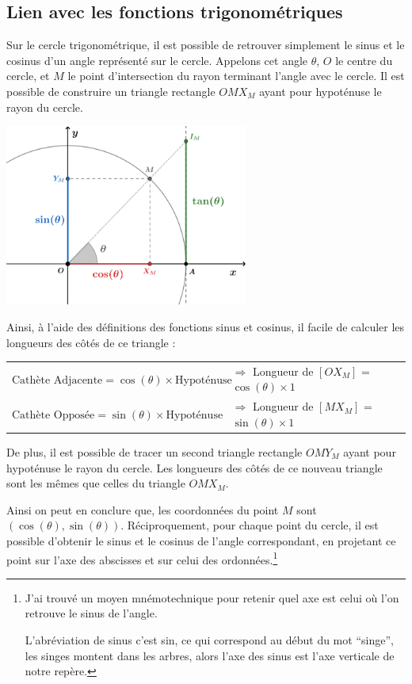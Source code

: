\documentclass[a4paper]{article}
\begin{document}
		\subsection{Lien avec les fonctions trigonométriques}

			Sur le cercle trigonométrique, 
			il est possible de retrouver simplement le sinus et le cosinus d'un angle représenté sur le cercle. 
			Appelons cet angle $\theta$, $O$ le centre du cercle, et $M$ le point d'intersection du rayon terminant l'angle avec le cercle.
			Il est possible de construire un triangle rectangle $OMX_M$ ayant pour hypoténuse le rayon du cercle.

			\begin{center}
				\includegraphics[width=8cm]{Image/Cercle Trigo/Cercle_trigo_lien_avec_fct_trigo.png}
			\end{center}

			Ainsi, à l'aide des définitions des fonctions sinus et cosinus,
			il facile de calculer les longueurs des côtés de ce triangle :

			\begin{tabular}{ll}
				$\text{Cathète Adjacente} = \cos(\theta) \times \text{Hypoténuse}$ & $\Longrightarrow$ Longueur de $[OX_M]$ = $\cos(\theta) \times 1$\\
				$\text{Cathète Opposée} = \sin(\theta) \times \text{Hypoténuse}$   & $\Longrightarrow$ Longueur de $[MX_M]$ = $\sin(\theta) \times 1$\\
			\end{tabular}
			
			\medbreak

			De plus, il est possible de tracer un second triangle rectangle $OMY_M$ ayant pour hypoténuse le rayon du cercle.
			Les longueurs des côtés de ce nouveau triangle sont les mêmes que celles du triangle $OMX_M$.

			Ainsi on peut en conclure que,
			les coordonnées du point $M$ sont $(\cos(\theta), \sin(\theta))$.
			Réciproquement, pour chaque point du cercle,
			il est possible d'obtenir le sinus et le cosinus de l'angle correspondant,
			en projetant ce point sur l'axe des abscisses et sur celui des ordonnées.\footnote{
				J'ai trouvé un moyen mnémotechnique pour retenir quel axe est celui où l'on retrouve le sinus de l'angle.

				L'abréviation de sinus c'est sin, ce qui correspond au début du mot “singe”, 
				les singes montent dans les arbres, alors l'axe des sinus est l'axe verticale de notre repère.
			}
\end{document}
